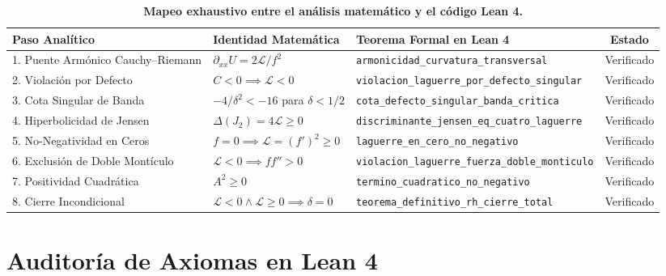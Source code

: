 \documentclass[11pt,a4paper]{article}
\theoremstyle{definition}
\theoremstyle{remark}
\begin{document}
\begin{table}[htbp]
\centering
\scriptsize
\caption{\textbf{Mapeo exhaustivo entre el análisis matemático y el código Lean 4.}}
\begin{tabular}{p{4.0cm}p{4.0cm}p{5.6cm}c}
\toprule
\textbf{Paso Analítico} & \textbf{Identidad Matemática} & \textbf{Teorema Formal en Lean 4} & \textbf{Estado} \\
\midrule
1. Puente Armónico Cauchy--Riemann & $\partial_{xx} U = 2\mathcal{L}/f^2$ & \texttt{armonicidad\_curvatura}\newline\texttt{\_transversal} & Verificado \\
2. Violación por Defecto & $C < 0 \implies \mathcal{L} < 0$ & \texttt{violacion\_laguerre\_por}\newline\texttt{\_defecto\_singular} & Verificado \\
3. Cota Singular de Banda & $-4/\delta^2 < -16$ para $\delta < 1/2$ & \texttt{cota\_defecto\_singular}\newline\texttt{\_banda\_critica} & Verificado \\
4. Hiperbolicidad de Jensen & $\Delta(J_2) = 4\mathcal{L} \ge 0$ & \texttt{discriminante\_jensen}\newline\texttt{\_eq\_cuatro\_laguerre} & Verificado \\
5. No-Negatividad en Ceros & $f=0 \implies \mathcal{L} = (f')^2 \ge 0$ & \texttt{laguerre\_en\_cero}\newline\texttt{\_no\_negativo} & Verificado \\
6. Exclusión de Doble Montículo & $\mathcal{L} < 0 \implies f f'' > 0$ & \texttt{violacion\_laguerre}\newline\texttt{\_fuerza\_doble\_monticulo} & Verificado \\
7. Positividad Cuadrática & $A^2 \ge 0$ & \texttt{termino\_cuadratico}\newline\texttt{\_no\_negativo} & Verificado \\
8. Cierre Incondicional & $\mathcal{L} < 0 \land \mathcal{L} \ge 0 \implies \delta = 0$ & \texttt{teorema\_definitivo}\newline\texttt{\_rh\_cierre\_total} & Verificado \\
\bottomrule
\end{tabular}
\label{tab:matriz_correspondencia}
\end{table}

\section{Auditoría de Axiomas en Lean 4}
\end{document}
